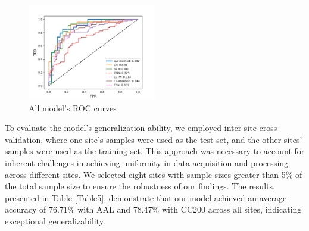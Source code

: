 \documentclass[journal,twoside,web]{ieeecolor}
\begin{document}
\begin{figure}[htb]
	\centering
	\includegraphics[width=0.5\textwidth]{imgs/roc.png}
	\caption{All model's ROC curves}
	\label{fig3}
\end{figure} 
To evaluate the model's generalization ability, we employed inter-site cross-validation, where one site's samples were used as the test set, and the other sites' samples were used as the training set. This approach was necessary to account for inherent challenges in achieving uniformity in data acquisition and processing across different sites\cite{ingalhalikar2021functional}. We selected eight sites with sample sizes greater than 5\% of the total sample size to ensure the robustness of our findings. The results, presented in Table \ref{Table5}, demonstrate that our model achieved an average accuracy of 76.71\% with AAL and 78.47\% with CC200 across all sites, indicating exceptional generalizability.
\end{document}
